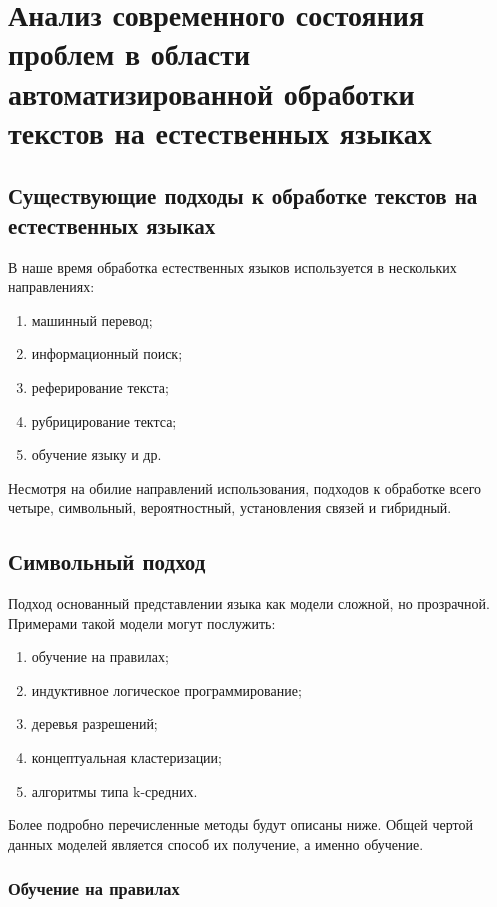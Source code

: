 \documentclass{standalone}
\begin{document}
\chapter{Анализ современного состояния проблем в области автоматизированной обработки текстов
на естественных языках}%
\ttl
\section{Существующие подходы к обработке текстов на естественных языках}
\par В наше время обработка естественных языков используется в нескольких направлениях:
\begin{enumerate}
    \item машинный перевод;
    \item информационный поиск;
    \item реферирование текста;
    \item рубрицирование тектса;
    \item обучение языку и др.
\end{enumerate}
\par Несмотря на обилие направлений использования, подходов к обработке всего четыре, символьный, вероятностный, установления связей и гибридный.
\section{Символьный подход}
\par Подход основанный представлении языка как модели сложной, но прозрачной. Примерами такой модели могут послужить:
\begin{enumerate}
    \item обучение на правилах;
    \item индуктивное логическое программирование;
    \item деревья разрешений;
    \item концептуальная кластеризации;
    \item алгоритмы типа k-средних.
\end{enumerate}
\par Более подробно перечисленные методы будут описаны ниже. Общей чертой данных моделей является способ их получение, а именно обучение.
\subsection{Обучение на правилах} %
\end{document}
